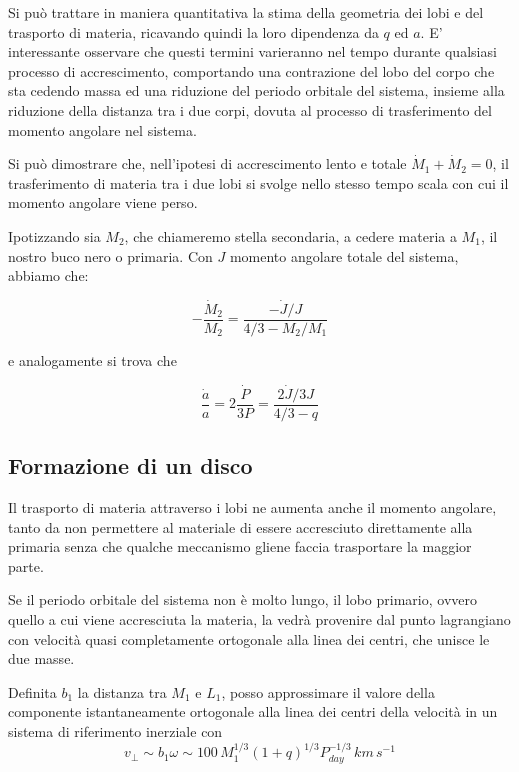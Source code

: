 \documentclass[a4paperbi]{article}
\begin{document}
	Si può trattare in maniera quantitativa la stima della geometria dei lobi e del trasporto di materia, ricavando quindi la loro dipendenza da $q$ ed $a$. E' interessante osservare che questi termini varieranno nel tempo durante qualsiasi processo di accrescimento, comportando una contrazione del lobo del corpo che sta cedendo massa ed una riduzione del periodo orbitale del sistema, insieme alla riduzione della distanza tra i due corpi, dovuta al processo di trasferimento del momento angolare nel sistema.
	
	Si può dimostrare che, nell'ipotesi di accrescimento lento e totale $\dot{M}_1+\dot{M}_2=0$, il trasferimento di materia tra i due lobi si svolge nello stesso tempo scala con cui il momento angolare viene perso.
	
	Ipotizzando sia $M_2$, che chiameremo stella secondaria, a cedere materia a $M_1$, il nostro buco nero o primaria. Con $J$ momento angolare totale del sistema, abbiamo che:
	
	\begin{equation}
		-\frac{\dot{M}_2}{M_2}=\frac{-\dot{J}/J}{4/3-M_2/M_1}
	\end{equation}
	
	e analogamente si trova che

	\begin{equation}
		\frac{\dot{a}}{a}=2\frac{\dot{P}}{3P}=\frac{2\dot{J}/3J}{4/3-q}
	\end{equation}
	
\subsection{Formazione di un disco}
	Il trasporto di materia attraverso i lobi ne aumenta anche il momento angolare, tanto da non permettere al materiale di essere accresciuto direttamente alla primaria senza che qualche meccanismo gliene faccia trasportare la maggior parte.
	
	Se il periodo orbitale del sistema non è molto lungo, il lobo primario, ovvero quello a cui viene accresciuta la materia, la vedrà provenire dal punto lagrangiano con velocità quasi completamente ortogonale alla linea dei centri, che unisce le due masse. 
	
	Definita $b_1$ la distanza tra $M_1$ e $L_1$, posso approssimare il valore della componente istantaneamente ortogonale alla linea dei centri della velocità in un sistema di riferimento inerziale con
	\begin{equation}
		v_\perp\sim b_1\omega\sim 100\,M_1^{1/3}(1+q)^{1/3}P^{-1/3}_{day}\,km\,s^{-1}
	\end{equation}  
	
\end{document}
